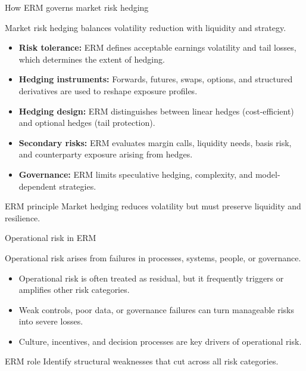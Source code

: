 \documentclass[aspectratio=169, 10pt]{beamer} %
\begin{document}
\begin{frame}{How ERM governs market risk hedging}

Market risk hedging balances volatility reduction with liquidity and strategy.

\medskip

\begin{itemize}
  \item[$\bullet$] \textbf{Risk tolerance:} ERM defines acceptable earnings
  volatility and tail losses, which determines the extent of hedging.

  \item[$\bullet$] \textbf{Hedging instruments:} Forwards, futures, swaps,
  options, and structured derivatives are used to reshape exposure profiles.

  \item[$\bullet$] \textbf{Hedging design:} ERM distinguishes between linear
  hedges (cost-efficient) and optional hedges (tail protection).

  \item[$\bullet$] \textbf{Secondary risks:} ERM evaluates margin calls,
  liquidity needs, basis risk, and counterparty exposure arising from hedges.

  \item[$\bullet$] \textbf{Governance:} ERM limits speculative hedging,
  complexity, and model-dependent strategies.
\end{itemize}

\begin{block}{ERM principle}
Market hedging reduces volatility but must preserve liquidity and resilience.
\end{block}

\end{frame}


\begin{frame}{Operational risk in ERM}

Operational risk arises from failures in processes, systems, people, or governance.

\medskip

\begin{itemize}
  \item[$\bullet$] Operational risk is often treated as residual, but it
  frequently triggers or amplifies other risk categories.

  \item[$\bullet$] Weak controls, poor data, or governance failures can turn
  manageable risks into severe losses.

  \item[$\bullet$] Culture, incentives, and decision processes are key drivers
  of operational risk.
\end{itemize}

\begin{block}{ERM role}
Identify structural weaknesses that cut across all risk categories.
\end{block}

\end{frame}
\end{document}
